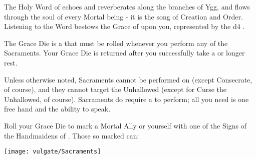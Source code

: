 



    The Holy Word of \TheAuthority echoes and reverberates along the branches of Ygg, and flows through the soul of every Mortal being - it is the song of Creation and Order.  Listening to the Word bestows the Grace of \TheAuthority upon you, represented by the d4 .



    The Grace Die is a  that must be rolled whenever you perform any of the Sacraments. Your Grace Die is returned after you successfully take a  or longer rest.

    Unless otherwise noted, Sacraments cannot be performed on  (except Consecrate, of course), and they cannot target the Unhallowed (except for Curse the Unhallowed, of course).  Sacraments do  require a  to perform; all you need is one free hand and the ability to speak.


   Roll your Grace Die to mark a Mortal Ally or yourself with one of the Signs of the Handmaidens of \TheAuthority. Those so marked can:

\cbreak

\begin{center}
\texttt{[image: vulgate/Sacraments]}
\end{center}


